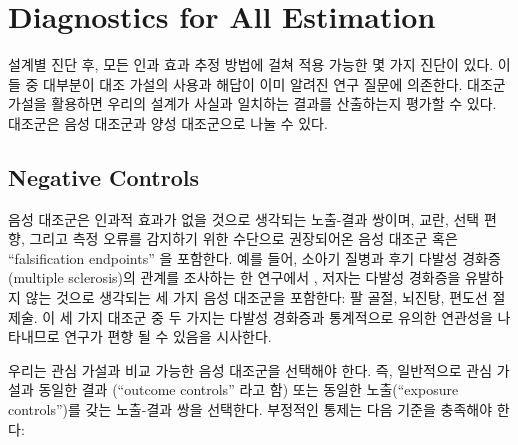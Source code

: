 \documentclass[11pt]{book}
\theoremstyle{definition}
\theoremstyle{definition}
\theoremstyle{definition}
\theoremstyle{remark}
\begin{document}
\section{Diagnostics for All
Estimation}\label{diagnostics-for-all-estimation}

설계별 진단 후, 모든 인과 효과 추정 방법에 걸쳐 적용 가능한 몇 가지
진단이 있다. 이들 중 대부분이 대조 가설의 사용과 해답이 이미 알려진 연구
질문에 의존한다. 대조군 가설을 활용하면 우리의 설계가 사실과 일치하는
결과를 산출하는지 평가할 수 있다. 대조군은 음성 대조군과 양성 대조군으로
나눌 수 있다.

\subsection{Negative Controls}\label{NegativeControls}


음성 대조군은 인과적 효과가 없을 것으로 생각되는 노출-결과 쌍이며, 교란,
\citep{lipsitch_2010} 선택 편향, 그리고 측정 오류를 감지하기 위한
수단으로 권장되어온 음성 대조군 혹은 ``falsification
endpoints''\citep{prased_2013} 을 포함한다. \citep{arnold_2016} 예를
들어, 소아기 질병과 후기 다발성 경화증 (multiple sclerosis)의 관계를
조사하는 한 연구에서 \citep{zaadstra_2008}, 저자는 다발성 경화증을
유발하지 않는 것으로 생각되는 세 가지 음성 대조군을 포함한다: 팔 골절,
뇌진탕, 편도선 절제술. 이 세 가지 대조군 중 두 가지는 다발성 경화증과
통계적으로 유의한 연관성을 나타내므로 연구가 편향 될 수 있음을 시사한다.

우리는 관심 가설과 비교 가능한 음성 대조군을 선택해야 한다. 즉,
일반적으로 관심 가설과 동일한 결과 (``outcome controls'' 라고 함) 또는
동일한 노출(``exposure controls'')를 갖는 노출-결과 쌍을 선택한다.
부정적인 통제는 다음 기준을 충족해야 한다:
\end{document}
